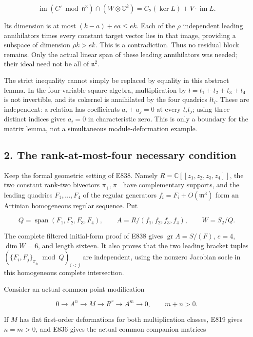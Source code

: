 \[
 \operatorname{im}(C'\bmod\mathfrak n^3)\cap(W\otimes\mathbb C^k)
   =C_2(\ker L)+V\cdot\operatorname{im}L.
 \tag{E839.3}
\]

Its dimension is at most \((k-a)+ea\le ek\). Each of the \(\rho\)
independent leading annihilators times every constant target vector lies
in that image, providing a subspace of dimension \(\rho k>ek\). This is
a contradiction. Thus no residual block remains. Only the actual linear
span of these leading annihilators was needed; their ideal need not be
all of \(\mathfrak n^2\).

The strict inequality cannot simply be replaced by equality in this
abstract lemma. In the four-variable square algebra, multiplication by
\(l=t_1+t_2+t_3+t_4\) is not invertible, and its cokernel is annihilated
by the four quadrics \(lt_i\). These are independent: a relation has
coefficients \(a_i+a_j=0\) at every \(t_it_j\); using three distinct
indices gives \(a_i=0\) in characteristic zero. This is only a boundary
for the matrix lemma, not a simultaneous module-deformation example.

\subsection{2. The rank-at-most-four necessary
condition}\label{the-rank-at-most-four-necessary-condition}

Keep the formal geometric setting of E838. Namely
\(R=\mathbb C[[z_1,z_2,z_3,z_4]]\), the two constant rank-two bivectors
\(\pi_+,\pi_-\) have complementary supports, and the leading quadrics
\(F_1,\ldots,F_4\) of the regular generators
\(f_i=F_i+O(\mathfrak m^3)\) form an Artinian homogeneous regular
sequence. Put

\[
 Q=\operatorname{span}(F_1,F_2,F_3,F_4),\qquad
 A=R/(f_1,f_2,f_3,f_4),\qquad W=S_2/Q.
 \tag{E839.4}
\]

The complete filtered initial-form proof of E838 gives
\(\operatorname{gr}A=S/(F)\), \(e=4\), \(\dim W=6\), and length sixteen.
It also proves that the two leading bracket tuples
\((\{F_i,F_j\}_{\pi_\pm}\bmod Q)_{i<j}\) are independent, using the
nonzero Jacobian socle in this homogeneous complete intersection.

Consider an actual common point modification

\[
 0\longrightarrow A^n\longrightarrow M\longrightarrow R^r
       \longrightarrow A^m\longrightarrow0,\qquad m+n>0.
 \tag{E839.5}
\]

If \(M\) has flat first-order deformations for both multiplication
classes, E819 gives \(n=m>0\), and E836 gives the actual common
companion matrices

